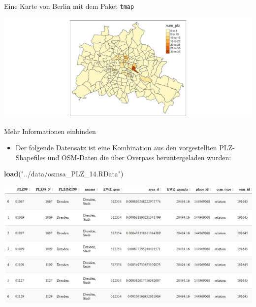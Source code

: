 \documentclass[ignorenonframetext,]{beamer}
\newenvironment{Shaded}{\begin{snugshade}}{\end{snugshade}}
\newcommand{\DataTypeTok}[1]{\textcolor[rgb]{0.74,0.68,0.62}{\underline{#1}}}
\newcommand{\DecValTok}[1]{\textcolor[rgb]{0.27,0.67,0.26}{#1}}
\newcommand{\KeywordTok}[1]{\textcolor[rgb]{0.26,0.66,0.93}{\textbf{#1}}}
\newcommand{\NormalTok}[1]{\textcolor[rgb]{0.74,0.68,0.62}{#1}}
\newcommand{\OperatorTok}[1]{\textcolor[rgb]{0.74,0.68,0.62}{#1}}
\newcommand{\StringTok}[1]{\textcolor[rgb]{0.02,0.61,0.04}{#1}}
\providecommand{\tightlist}{%
  \setlength{\itemsep}{0pt}\setlength{\parskip}{0pt}}
\begin{document}
\begin{frame}[fragile]{Eine Karte von Berlin mit dem Paket
\texttt{tmap}}
\protect\hypertarget{eine-karte-von-berlin-mit-dem-paket-tmap}{}

\begin{Shaded}
\end{Shaded}

\includegraphics{B4_Overpass_files/figure-beamer/unnamed-chunk-19-1.pdf}

\end{frame}

\begin{frame}[fragile]{Mehr Informationen einbinden}
\protect\hypertarget{mehr-informationen-einbinden}{}

\begin{itemize}
\tightlist
\item
  Der folgende Datensatz ist eine Kombination aus den vorgestellten
  PLZ-Shapefiles und OSM-Daten die über Overpass heruntergeladen wurden:
\end{itemize}

\begin{Shaded}
\begin{Highlighting}[]
\KeywordTok{load}\NormalTok{(}\StringTok{"../data/osmsa_PLZ_14.RData"}\NormalTok{)}
\end{Highlighting}
\end{Shaded}

\includegraphics{figure/osmsa_ex.PNG}

\end{frame}
\end{document}
